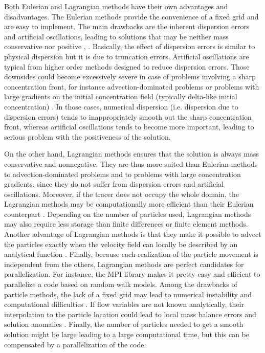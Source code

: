 Both Eulerian and Lagrangian methods have their own advantages and disadvantages. The Eulerian methods provide the convenience of a fixed grid and are easy to implement. The main drawbacks are the inherent dispersion errors and artificial oscillations, leading to solutions that may be neither mass conservative nor positive \cite{stijn1987positive}, \cite{yang1998accuracy}. Basically, the effect of dispersion errors is similar to physical dispersion but it is due to truncation errors. Artificial oscillations are typical from higher order methods designed to reduce dispersion errors. Those downsides could become excessively severe in case of problems involving a sharp concentration front, for instance advection-dominated problems or problems with large gradients on the initial concentration field (typically delta-like initial concentration) \cite{zheng2002applied}. In those cases, numerical dispersion (i.e. dispersion due to dispersion errors) tends to inappropriately smooth out the sharp concentration front, whereas artificial oscillations tends to become more important, leading to serious problem with the positiveness of the solution. 

On the other hand, Lagrangian methods ensures that the solution is always mass conservative and nonnegative. They are thus more suited than Eulerian methods to advection-dominated problems and to problems with large concentration gradients, since they do not suffer from dispersion errors and artificial oscillations. Moreover, if the tracer does not occupy the whole domain, the Lagrangian methods may be computationally more efficient than their Eulerian counterpart \cite{hunter1987application}. Depending on the number of particles used, Lagrangian methods may also require less storage than finite differences or finite element methods. Another advantage of Lagrangian methods is that they make it possible to advect the particles exactly when  the velocity field can locally be described by an analytical function \cite{hunter1993use}. Finally, because each realization of the particle movement is independent from the others, Lagrangian methods are perfect candidates for parallelization. For instance, the MPI library makes it pretty easy and efficient to parallelize a code based on random walk models. Among the drawbacks of particle methods, the lack of a fixed grid may lead to numerical instability and computational difficulties \cite{yeh1990lagrangian}. If flow variables are not known analytically, their interpolation to the particle location could lead to local mass balance errors and solution anomalies \cite{labolle1996random}. Finally, the number of particles needed to get a smooth solution might be large leading to a large computational time, but this can be compensated by a parallelization of the code.

